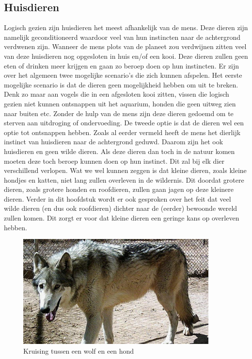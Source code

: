 \subsection{Huisdieren}
Logisch gezien zijn huisdieren het meest afhankelijk van de mens. Deze dieren zijn namelijk geconditioneerd waardoor veel van hun instincten naar de achtergrond verdwenen zijn. Wanneer de mens plots van de planeet zou verdwijnen zitten veel van deze huisdieren nog opgesloten in huis en/of een kooi. Deze dieren zullen geen eten of drinken meer krijgen en gaan zo beroep doen op hun instincten. Er zijn over het algemeen twee mogelijke scenario's die zich kunnen afspelen.
\newline\newline
Het eerste mogelijke scenario is dat de dieren geen mogelijkheid hebben om uit te breken. Denk zo maar aan vogels die in een afgesloten kooi zitten, vissen die logisch gezien niet kunnen ontsnappen uit het aquarium, honden die geen uitweg zien naar buiten etc. Zonder de hulp van de mens zijn deze dieren gedoemd om te sterven aan uitdroging of ondervoeding.
\newline\newline
De tweede optie is dat de dieren wel een optie tot ontsnappen hebben. Zoals al eerder vermeld heeft de mens het dierlijk instinct van huisdieren naar de achtergrond geduwd. Daarom zijn het ook huisdieren en geen wilde dieren. Als deze dieren dan toch in de natuur komen moeten deze toch beroep kunnen doen op hun instinct. Dit zal bij elk dier verschillend verlopen. Wat we wel kunnen zeggen is dat kleine dieren, zoals kleine hondjes en katten, niet lang zullen overleven in de wildernis. Dit doordat grotere dieren, zoals grotere honden en roofdieren, zullen gaan jagen op deze kleinere dieren. Verder in dit hoofdstuk wordt er ook gesproken over het feit dat veel wilde dieren (en dus ook roofdieren) dichter naar de (eerder) bewoonde wereld zullen komen. Dit zorgt er voor dat kleine dieren een geringe kans op overleven hebben. 
\newline
\begin{figure}
  \centering
    \includegraphics[width=0.9\textwidth]{WolfHond.jpg}
  \caption{Kruising tussen een wolf en een hond \cite{redactieHLN}}
  \label{fig:wolfhond}
\end{figure}
